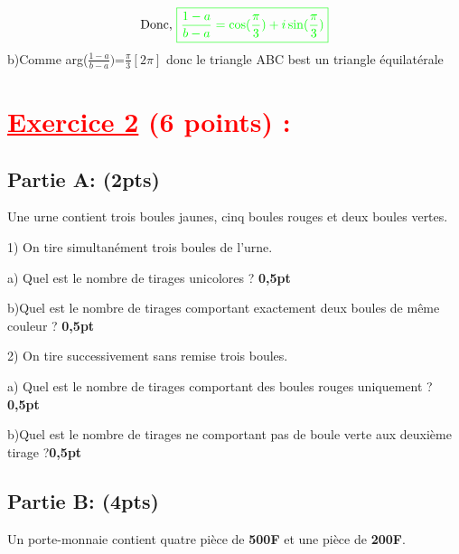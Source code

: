 \documentclass[12pt]{article}
\begin{document}
\[\text{Donc, }\color{green}{\boxed{\frac{1-a}{b-a}=\cos(\frac{\pi}{3})+i\sin(\frac{\pi}{3})}}\]
b)Comme arg($\frac{1-a}{b-a})$=$\frac{\pi}{3}[2\pi]$ donc le triangle ABC best un triangle équilatérale

\section*{\textcolor{red}{\underline{Exercice 2} (6 points) :}}
\subsection*{Partie A: (2pts)}
Une urne contient trois boules jaunes, cinq boules rouges et deux boules vertes.

1) On tire simultanément trois boules de l'urne.

a) Quel est le nombre de tirages unicolores ? \textbf{0,5pt}

b)Quel est le nombre de tirages comportant exactement deux boules de même couleur ? \textbf{0,5pt}

2) On tire successivement sans remise trois boules.

a) Quel est le nombre de tirages comportant des boules rouges uniquement ? \textbf{0,5pt}

b)Quel est le nombre de tirages ne comportant pas de boule verte aux deuxième tirage ?\textbf{0,5pt}
\subsection*{Partie B: (4pts)}
Un porte-monnaie contient quatre pièce de \textbf{500F} et une pièce de \textbf{200F}.
\end{document}
